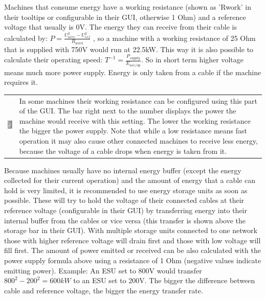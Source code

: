 \documentclass[11pt]{article} %
\makeatletter
\newcommand{\imgtex}{\begin{tabularx}{\textwidth}{@{}c@{ }X@{}}}
\makeatother
\begin{document}
Machines that consume energy have a working resistance (shown as 'Rwork' in their tooltips or configurable in their GUI, otherwise 1 Ohm) and a reference voltage that usually is 0V. The energy they can receive from their cable is calculated by: ${P = \frac{U_{wire}^2 - U_{ref}^2}{R_{work}}}$ , so a machine with a working resistance of 25 Ohm that is supplied with 750V would run at 22.5kW. This way it is also possible to calculate their operating speed: ${T^{-1} = \frac{P_{supply}}{E_{use/op}}}$. So in short term higher voltage means much more power supply. Energy is only taken from a cable if the machine requires it. \\
\imgtex
\includegraphics[align = t]{RworkCfg} & In some machines their working resistance can be configured using this part of the GUI. The bar right next to the number displays the power the machine would receive with this setting. The lower the working resistance the bigger the power supply. Note that while a low resistance means fast operation it may also cause other connected machines to receive less energy, because the voltage of a cable drops when energy is taken from it. \\
\end{tabularx}

Because machines usually have no internal energy buffer (except the energy collected for their current operation) and the amount of energy that a cable can hold is very limited, it is recommended to use energy storage units as soon as possible. These will try to hold the voltage of their connected cables at their reference voltage (configurable in their GUI) by transferring energy into their internal buffer from the cables or vice versa (this transfer is shown above the storage bar in their GUI). With multiple storage units connected to one network those with higher reference voltage will drain first and those with low voltage will fill first. The amount of power emitted or received can be also calculated with the power supply formula above using a resistance of 1 Ohm (negative values indicate emitting power). Example: An ESU set to 800V would transfer ${800^2 - 200^2 = 600kW}$ to an ESU set to 200V. The bigger the difference between cable and reference voltage, the bigger the energy transfer rate.
\end{document}
